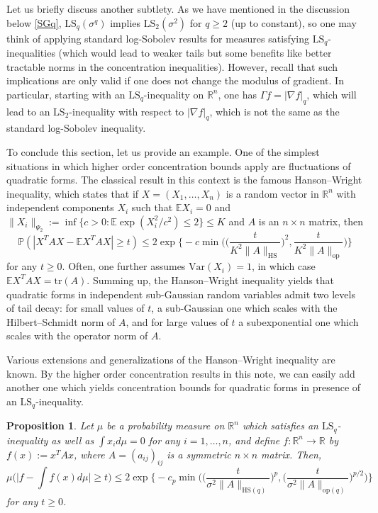 \documentclass[a4paper,12pt]{amsart}
\numberwithin{equation}{section}
\newtheorem{proposition}[satz]{Proposition}
\theoremstyle{remark}
\def\E{{\mathbb E}}
\def\P{{\mathbb P}}
\def\R{{\mathbb R}}
\begin{document}
Let us briefly discuss another subtlety. As we have mentioned in the discussion below \eqref{SGq}, $\mathrm{LS}_q(\sigma^q)$ implies $\mathrm{LS}_2(\sigma^2)$ for $q \ge 2$ (up to constant), so one may think of applying standard log-Sobolev results for measures satisfying $\mathrm{LS}_q$-inequalities (which would lead to weaker tails but some benefits like better tractable norms in the concentration inequalities). However, recall that such implications are only valid if one does not change the modulus of gradient. In particular, starting with an $\mathrm{LS}_q$-inequality on $\R^n$, one has $\Gamma f = |\nabla f|_q$, which will lead to an $\mathrm{LS}_2$-inequality with respect to $|\nabla f|_q$, which is not the same as the standard log-Sobolev inequality.

To conclude this section, let us provide an example. One of the simplest situations in which higher order concentration bounds apply are fluctuations of quadratic forms. The classical result in this context is the famous Hanson--Wright inequality, which states that if $X=(X_1, \ldots,X_n)$ is a random vector in $\R^n$ with independent components $X_i$ such that $\E X_i=0$ and $\lVert X_i \rVert_{\Psi_2} := \inf \{c > 0 \colon \E \exp(X_i^2/c^2) \le 2\} \le K$ and $A$ is an $n \times n$ matrix, then
\[
\P(|X^TAX - \E X^TAX| \ge t) \le 2\exp\Big\{-c\min \Big(\Big(\frac{t}{K^2\lVert A \rVert_\mathrm{HS}}\Big)^2, \frac{t}{K^2\lVert A \rVert_\mathrm{op}}\Big)\Big\}
\]
for any $t \ge 0$. Often, one further assumes $\mathrm{Var}(X_i)=1$, in which case $\E X^TAX = \mathrm{tr}(A)$. Summing up, the Hanson--Wright inequality yields that quadratic forms in independent sub-Gaussian random variables admit two levels of tail decay: for small values of $t$, a sub-Gaussian one which scales with the Hilbert--Schmidt norm of $A$, and for large values of $t$ a subexponential one which scales with the operator norm of $A$.

Various extensions and generalizations of the Hanson--Wright inequality are known. By the higher order concentration results in this note, we can easily add another one which yields concentration bounds for quadratic forms in presence of an $\mathrm{LS}_q$-inequality.

\begin{proposition}\label{HWI}
    Let $\mu$ be a probability measure on $\R^n$ which satisfies an $\mathrm{LS}_q$-inequality as well as $\int x_i d\mu = 0$ for any $i=1, \ldots,n$, and define $f\colon \R^n \to \R$ by $f(x) := x^TAx$, where $A=(a_{ij})_{ij}$ is a symmetric $n \times n$ matrix. Then,
    \[
    \mu\Big(\Big|f - \int f(x)d\mu\Big| \ge t\Big) \le 2\exp\Big\{-c_p\min \Big(\Big(\frac{t}{\sigma^2\lVert A \rVert_{\mathrm{HS}(q)}}\Big)^p, \Big(\frac{t}{\sigma^2\lVert A \rVert_{\mathrm{op}(q)}}\Big)^{p/2}\Big)\Big\}
    \]
    for any $t \ge 0$.
\end{proposition}
\end{document}
